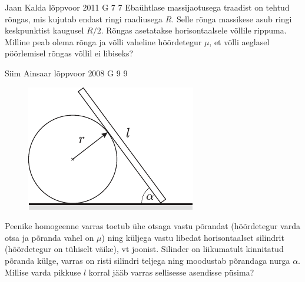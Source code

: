 \documentclass[11pt]{article}
\begin{document}
{%
{Jaan Kalda} %
{lõppvoor} %
{2011} %
{G 7} %
{7} %
{
\ifStatement
Ebaühtlase massijaotusega traadist on tehtud rõngas, mis kujutab endast ringi raadiusega $R$. Selle rõnga massikese asub ringi keskpunktist
kaugusel $R/2$. Rõngas asetatakse horisontaalsele võllile rippuma. Milline peab
olema rõnga ja võlli vaheline hõõrdetegur $\mu$, et võlli aeglasel pöörlemisel rõngas
võllil ei libiseks?
\fi
}

{Siim Ainsaar} %
{lõppvoor} %
{2008} %
{G 9} %
{9} %
{
\ifStatement
\begin{figure}
	\begin{center}
		\vspace{-25pt}
		\includegraphics[width=\linewidth]{2008-v3g-09-yl}
	\end{center}
\end{figure}
Peenike homogeenne varras toetub ühe otsaga vastu põrandat (hõõrdetegur varda otsa ja põranda vahel on $\mu$) ning küljega vastu libedat horisontaalset silindrit (hõõrdetegur on tühiselt väike), vt joonist. Silinder on liikumatult kinnitatud põranda külge, varras on risti silindri teljega ning moodustab põrandaga nurga $\alpha$. Millise varda pikkuse $l$ korral jääb varras sellisesse asendisse püsima?
\fi
}

}
\end{document}
